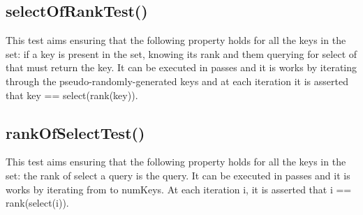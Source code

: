 \subsection{{\ttfamily selectOfRankTest()}}

This test aims ensuring that the following property holds for all the keys in the set: if a key is present in the set, knowing its rank and them querying for select of that must return the key. It can be executed in passes and it is works by iterating through the pseudo-randomly-generated keys and at each iteration it is asserted that {\ttfamily key == select(rank(key))}.

\subsection{{\ttfamily rankOfSelectTest()}}

This test aims ensuring that the following property holds for all the keys in the set: the rank of select a query is the query. It can be executed in passes and it is works by iterating from {} to {\ttfamily numKeys}. At each iteration {\ttfamily i}, it is asserted that {\ttfamily i == rank(select(i))}.